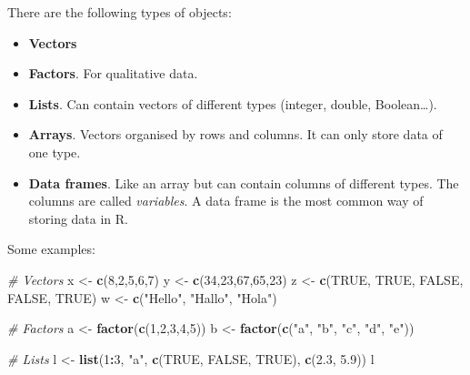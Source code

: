 \documentclass[
]{article}
\newenvironment{Shaded}{\begin{snugshade}}{\end{snugshade}}
\newcommand{\CommentTok}[1]{\textcolor[rgb]{0.56,0.35,0.01}{\textit{#1}}}
\newcommand{\DecValTok}[1]{\textcolor[rgb]{0.00,0.00,0.81}{#1}}
\newcommand{\FloatTok}[1]{\textcolor[rgb]{0.00,0.00,0.81}{#1}}
\newcommand{\KeywordTok}[1]{\textcolor[rgb]{0.13,0.29,0.53}{\textbf{#1}}}
\newcommand{\NormalTok}[1]{#1}
\newcommand{\OperatorTok}[1]{\textcolor[rgb]{0.81,0.36,0.00}{\textbf{#1}}}
\newcommand{\OtherTok}[1]{\textcolor[rgb]{0.56,0.35,0.01}{#1}}
\newcommand{\StringTok}[1]{\textcolor[rgb]{0.31,0.60,0.02}{#1}}
\providecommand{\tightlist}{%
  \setlength{\itemsep}{0pt}\setlength{\parskip}{0pt}}
\begin{document}
There are the following types of objects:

\begin{itemize}
\tightlist
\item
  \textbf{Vectors}
\item
  \textbf{Factors}. For qualitative data.
\item
  \textbf{Lists}. Can contain vectors of different types (integer,
  double, Boolean\ldots).
\item
  \textbf{Arrays}. Vectors organised by rows and columns. It can only
  store data of one type.
\item
  \textbf{Data frames}. Like an array but can contain columns of
  different types. The columns are called \emph{variables}. A data frame
  is the most common way of storing data in R.
\end{itemize}

Some examples:

\begin{Shaded}
\begin{Highlighting}[]
\CommentTok{# Vectors}
\NormalTok{x <-}\StringTok{ }\KeywordTok{c}\NormalTok{(}\DecValTok{8}\NormalTok{,}\DecValTok{2}\NormalTok{,}\DecValTok{5}\NormalTok{,}\DecValTok{6}\NormalTok{,}\DecValTok{7}\NormalTok{)}
\NormalTok{y <-}\StringTok{ }\KeywordTok{c}\NormalTok{(}\DecValTok{34}\NormalTok{,}\DecValTok{23}\NormalTok{,}\DecValTok{67}\NormalTok{,}\DecValTok{65}\NormalTok{,}\DecValTok{23}\NormalTok{)}
\NormalTok{z <-}\StringTok{ }\KeywordTok{c}\NormalTok{(}\OtherTok{TRUE}\NormalTok{, }\OtherTok{TRUE}\NormalTok{, }\OtherTok{FALSE}\NormalTok{, }\OtherTok{FALSE}\NormalTok{, }\OtherTok{TRUE}\NormalTok{)}
\NormalTok{w <-}\StringTok{ }\KeywordTok{c}\NormalTok{(}\StringTok{"Hello"}\NormalTok{, }\StringTok{"Hallo"}\NormalTok{, }\StringTok{"Hola"}\NormalTok{)}

\CommentTok{# Factors}
\NormalTok{a <-}\StringTok{ }\KeywordTok{factor}\NormalTok{(}\KeywordTok{c}\NormalTok{(}\DecValTok{1}\NormalTok{,}\DecValTok{2}\NormalTok{,}\DecValTok{3}\NormalTok{,}\DecValTok{4}\NormalTok{,}\DecValTok{5}\NormalTok{))}
\NormalTok{b <-}\StringTok{ }\KeywordTok{factor}\NormalTok{(}\KeywordTok{c}\NormalTok{(}\StringTok{"a"}\NormalTok{, }\StringTok{"b"}\NormalTok{, }\StringTok{"c"}\NormalTok{, }\StringTok{"d"}\NormalTok{, }\StringTok{"e"}\NormalTok{))}

\CommentTok{# Lists}
\NormalTok{l <-}\StringTok{ }\KeywordTok{list}\NormalTok{(}\DecValTok{1}\OperatorTok{:}\DecValTok{3}\NormalTok{, }\StringTok{"a"}\NormalTok{, }\KeywordTok{c}\NormalTok{(}\OtherTok{TRUE}\NormalTok{, }\OtherTok{FALSE}\NormalTok{, }\OtherTok{TRUE}\NormalTok{), }\KeywordTok{c}\NormalTok{(}\FloatTok{2.3}\NormalTok{, }\FloatTok{5.9}\NormalTok{))}
\NormalTok{l}
\end{Highlighting}
\end{Shaded}
\end{document}
